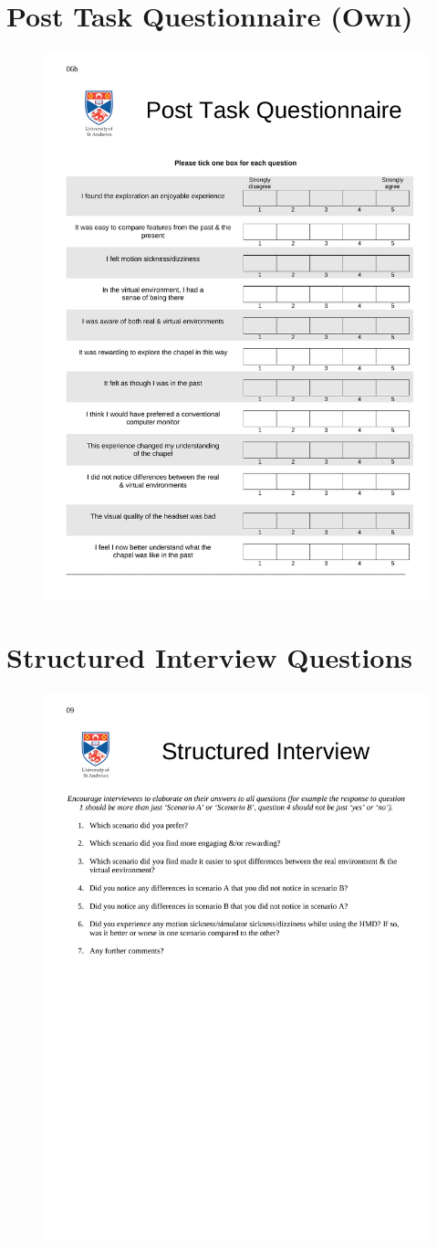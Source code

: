 \documentclass[oneside]{book}
\begin{document}
\chapter{Post Task Questionnaire (Own)}
\label{12_questions}
\begin{figure}[h]
	\begin{center}
		\includegraphics[width=0.7\linewidth]{PDFs/Post_Task_Questionnaire_2.pdf}
	\end{center}
\end{figure}

\chapter{Structured Interview Questions}
\label{interview_questions}
\begin{figure}[h]
	\begin{center}
		\includegraphics[width=0.7\linewidth]{PDFs/Structured_Interview.pdf}
	\end{center}
\end{figure}
\end{document}
